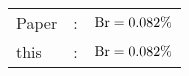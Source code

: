       \begin{tabular}{lcr}
          Paper &:& $\mathrm{Br}  = 0.082\%$ \\
          this      &:& $\mathrm{Br}  = 0.082\%$ \\        
      \end{tabular}
